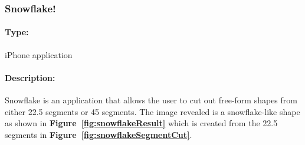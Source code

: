 \documentclass[11pt]{article}
\begin{document}
            \subsubsection{Snowflake!}
            
                \paragraph{Type:} iPhone application %
            
                \paragraph{Description:}
                Snowflake is an application that allows the user to cut out free-form shapes from either 22.5\textdegree{} segments or 45\textdegree{} segments. The image revealed is a snowflake-like shape as shown in \textbf{Figure~\ref{fig:snowflakeResult}} which is created from the 22.5\textdegree{} segments in \textbf{Figure~\ref{fig:snowflakeSegmentCut}}. 
                    
\end{document}
